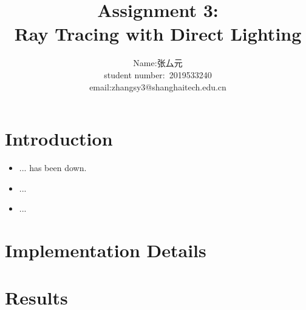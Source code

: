 \documentclass[acmtog]{acmart}
\title{Assignment 3:\\ {Ray Tracing with Direct Lighting}}
\author{Name:\quad 张厶元  \\ student number:\ 2019533240
\\email:\quad zhangsy3@shanghaitech.edu.cn}
\begin{document}
\maketitle

\vspace*{2 ex}

\section{Introduction}
\begin{itemize}
\item ... has been down.
\item ...
\item ...
\end{itemize}
\section{Implementation Details}

\section{Results}
\\
\end{document}
